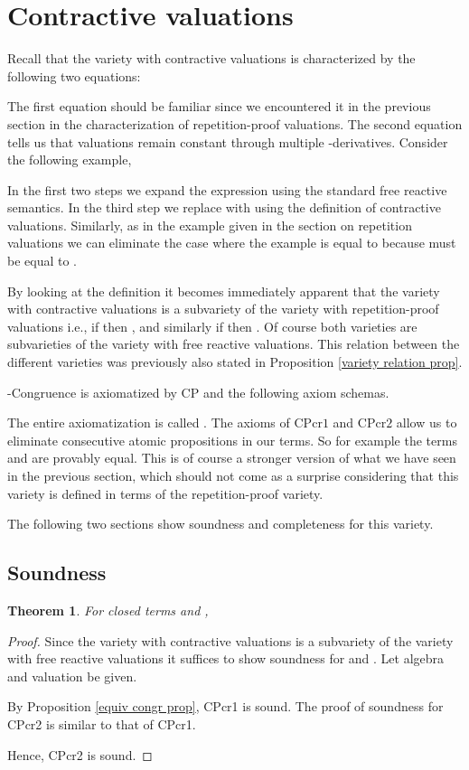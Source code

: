 \documentclass[a4paper,twoside,openright]{report}
\newcommand{\CPcr}[1]{\ensuremath{\mathrm{CPcr#1}}}
\newtheorem{thm}[theorem]{Theorem}
\begin{document}
\section{Contractive valuations}
Recall that the variety with contractive valuations is characterized by the following two equations:

The first equation should be familiar since we encountered it in the previous section in the characterization of repetition-proof valuations. The second equation tells us that valuations remain constant through multiple -derivatives. Consider the following example,

In the first two steps we expand the expression using the standard free reactive semantics. In the third step we replace  with  using the definition of contractive valuations. Similarly, as in the example given in the section on repetition valuations we can eliminate the case where the example is equal to  because  must be equal to .

By looking at the definition it becomes immediately apparent that the variety with contractive valuations is a subvariety of the variety with repetition-proof valuations i.e., if  then , and similarly if  then . Of course both varieties are subvarieties of the variety with free reactive valuations. This relation between the different varieties was previously also stated in Proposition \ref{variety relation prop}.

-Congruence is axiomatized by CP and the following axiom schemas.

The entire axiomatization is called . The axioms of \CPcr1 and \CPcr2 allow us to eliminate consecutive atomic propositions in our terms. So for example the terms  and  are provably equal. This is of course a stronger version of what we have seen in the previous section, which should not come as a surprise considering that this variety is defined in terms of the repetition-proof variety.



The following two sections show soundness and completeness for this variety.

\subsection{Soundness}
\begin{thm}
For closed terms  and ,

\end{thm}
\begin{proof}
Since the variety with contractive valuations is a subvariety of the variety with free reactive valuations it suffices to show soundness for  and . Let algebra  and valuation  be given.



By Proposition \ref{equiv congr prop}, CPcr1 is sound. The proof of soundness for CPcr2 is similar to that of CPcr1.



Hence, CPcr2 is sound.
\end{proof}
\end{document}
